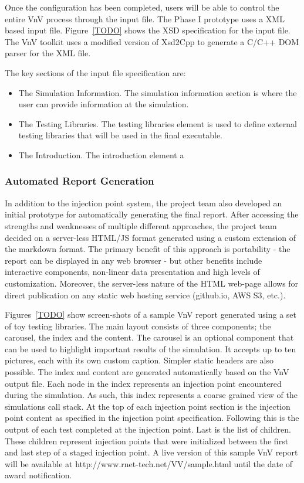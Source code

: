 Once the configuration has been completed, users will be able to control the entire VnV process through the input file. The Phase I prototype 
uses a XML based input file. Figure~\ref{TODO} shows the XSD specification for the input file. The VnV toolkit uses a  modified version of Xsd2Cpp to generate 
a C/C++ DOM parser for the XML file. 

The key sections of the input file specification are:
\begin{itemize}
 \item The Simulation Information. The simulation information section is where the user can provide information at the simulation. 
 \item The Testing Libraries. The testing libraries element is used to define external testing libraries that will be used in the final executable. 
 \item The Introduction. The introduction element a
\end{itemize}

\subsubsection{Automated Report Generation}

In addition to the injection point system, the project team also developed an initial prototype for automatically generating
the final report. After accessing the strengths and weaknesses of multiple different approaches, the project team
decided on a server-less HTML/JS format generated using a custom extension of the markdown format. The primary benefit of this approach is portability - the report can be displayed in any web browser - but other benefits include interactive components, non-linear data presentation and high levels of customization. Moreover, the server-less nature of the HTML web-page allows for direct publication on any static web hosting service (github.io, AWS S3, etc.). 

Figures~\ref{TODO} show screen-shots of a sample VnV report generated using a set of toy testing libraries. The main layout consists of three components; the carousel, the index and the content. The carousel is an optional component that can be used to highlight important results of the simulation. It accepts up to ten pictures, each with its own custom caption. Simpler static headers are also possible. The index and content are generated automatically based on the VnV output file. Each node in the index represents an injection point encountered during the simulation. As such, this index represents a coarse grained view of the simulations call stack. At the top of each injection point section is the injection point content as specified in the injection point specification. Following this is the output of each test completed at the injection point. Last is the list of children. These children represent injection points that were initialized between the first and last step of a staged injection point. A live version of this sample VnV report will be available at http://www.rnet-tech.net/VV/sample.html until the date of award notification. 

